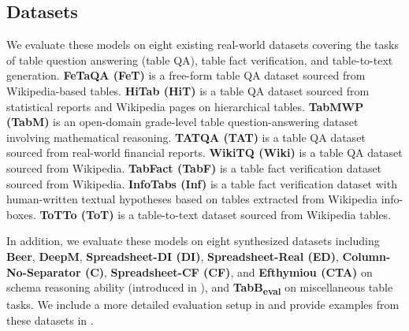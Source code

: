 \documentclass[11pt]{article}
\begin{document}
\subsection{Datasets}
We evaluate these models on eight existing real-world datasets covering the tasks of table question answering (table QA), table fact verification, and table-to-text generation.
\textbf{FeTaQA (FeT)} \citep{nan-etal-2022-fetaqa} is a free-form table QA dataset sourced from Wikipedia-based tables.
\textbf{HiTab (HiT)} \citep{cheng-etal-2022-hitab} is a table QA dataset sourced from statistical reports and Wikipedia pages on hierarchical tables.
\textbf{TabMWP (TabM)} \citep{lu2022dynamic} is an open-domain grade-level table question-answering dataset involving mathematical reasoning.
\textbf{TATQA (TAT)} \citep{zhu-etal-2021-tat} is a table QA dataset sourced from real-world financial reports.
\textbf{WikiTQ (Wiki)} \citep{pasupat-liang-2015-compositional} is a table QA dataset sourced from Wikipedia.
\textbf{TabFact (TabF)} \citep{chen2019tabfact} is a table fact verification dataset sourced from Wikipedia.
\textbf{InfoTabs (Inf)} \citep{gupta-etal-2020-infotabs} is a table fact verification dataset with human-written textual hypotheses based on tables extracted from Wikipedia info-boxes.
\textbf{ToTTo (ToT)} \citep{parikh-etal-2020-totto} is a table-to-text dataset sourced from Wikipedia tables.

In addition, we evaluate these models on eight synthesized datasets including \textbf{Beer}, \textbf{DeepM}, \textbf{Spreadsheet-DI (DI)}, \textbf{Spreadsheet-Real (ED)}, \textbf{Column-No-Separator (C)}, \textbf{Spreadsheet-CF (CF)}, and \textbf{Efthymiou (CTA)} \citep{li2023table} on schema reasoning ability (introduced in ), and \textbf{TabB\textsubscript{eval}} \citep{wu2024tablebenchcomprehensivecomplexbenchmark} on miscellaneous table tasks.
We include a more detailed evaluation setup in  and provide examples from these datasets in .
\end{document}
